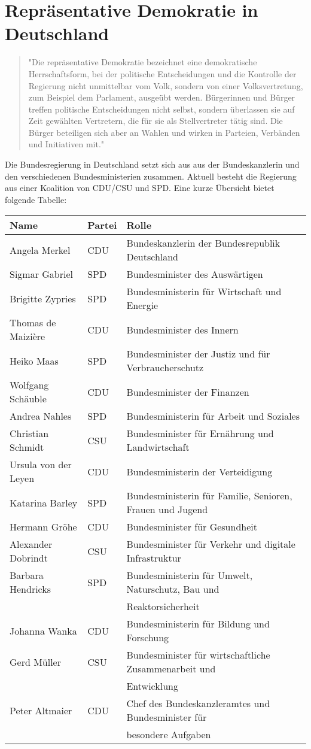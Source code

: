 \section{Repräsentative Demokratie in Deutschland}
\begin{quote}
"Die repräsentative Demokratie bezeichnet eine demokratische Herrschaftsform, bei der politische Entscheidungen und die Kontrolle der Regierung nicht unmittelbar vom Volk, sondern von einer Volksvertretung, zum Beispiel dem Parlament, ausgeübt werden.
Bürgerinnen und Bürger treffen politische Entscheidungen nicht selbst, sondern überlassen sie auf Zeit gewählten Vertretern, die für sie als Stellvertreter tätig sind. Die Bürger beteiligen sich aber an Wahlen und wirken in Parteien, Verbänden und Initiativen mit."
\end{quote}
\cite{bundesregierung}
Die Bundesregierung in Deutschland setzt sich aus aus der Bundeskanzlerin und den verschiedenen Bundesministerien zusammen. Aktuell besteht die Regierung aus einer Koalition von CDU/CSU und SPD. Eine kurze Übersicht bietet folgende Tabelle: \\
\begin{tabular}{lll}
\hline
Name & Partei & Rolle \\
\hline
Angela Merkel & CDU & Bundeskanzlerin der Bundesrepublik Deutschland \\
Sigmar Gabriel & SPD & Bundesminister des Auswärtigen \\
Brigitte Zypries & SPD & Bundesministerin für Wirtschaft und Energie \\
Thomas de Maizière & CDU & Bundesminister des Innern \\
Heiko Maas & SPD & Bundesminister der Justiz und für Verbraucherschutz \\
Wolfgang Schäuble & CDU & Bundesminister der Finanzen \\
Andrea Nahles & SPD & Bundesministerin für Arbeit und Soziales \\
Christian Schmidt & CSU & Bundesminister für Ernährung und Landwirtschaft \\
Ursula von der Leyen & CDU & Bundesministerin der Verteidigung \\
Katarina Barley  & SPD & Bundesministerin für Familie, Senioren, Frauen und Jugend \\
Hermann Gröhe & CDU & Bundesminister für Gesundheit \\
Alexander Dobrindt & CSU & Bundesminister für Verkehr und digitale Infrastruktur \\
Barbara Hendricks & SPD & Bundesministerin für Umwelt, Naturschutz, Bau und  \\
& & Reaktorsicherheit \\
Johanna Wanka & CDU & Bundesministerin für Bildung und Forschung \\
Gerd Müller & CSU & Bundesminister für wirtschaftliche Zusammenarbeit und \\
& & Entwicklung \\
Peter Altmaier & CDU & Chef des Bundeskanzleramtes und Bundesminister für  \\
& & besondere Aufgaben \\
\hline
\end{tabular} \\
